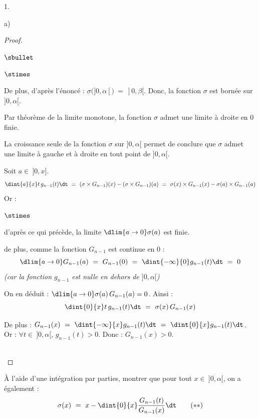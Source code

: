 \begin{noliste}{1.}
\begin{noliste}{a)}
\begin{proof}
\begin{noliste}{$\sbullet$}
\begin{liste}{$\stimes$}
	  \item De plus, d'après l'énoncé : $\sigma(]0,\alpha[) \ = \
	  ]0, \beta[$. Donc, la fonction $\sigma$ est bornée sur 
	  $]0,\alpha[$.
	\end{liste}
	\begin{noliste}{}
	  \item Par théorème de la limite monotone, la fonction 
	  $\sigma$ admet une limite à droite en $0$ finie.
	\end{noliste}
	
	\begin{remark}
	  La croissance seule de la fonction $\sigma$ sur 
	  $]0,\alpha[$ permet de conclure que $\sigma$ 
	  admet une limite à gauche et à droite en tout point de 
	  $]0,\alpha[$.
	\end{remark}
	
	
	\newpage
	
	
	Soit $a \in \ ]0,x]$.
	\[
	  \dint{a}{x} t \, g_{n-1}(t) \dt \ = \ (\sigma \times G_{n-1})
	  (x) - (\sigma \times G_{n-1})(a)
	  \ = \ \sigma(x) \times G_{n-1}(x) - \sigma(a) \times 
	  G_{n-1}(a)
	\]
	Or :
	\begin{noliste}{$\stimes$}
	  \item d'après ce qui précède, la limite $\dlim{a\to 0} 
	  \sigma(a)$ est finie.
	  \item de plus, comme la fonction $G_{n-1}$ est continue 
	  en $0$ : 
	  \[
	    \dlim{a \to 0} G_{n-1}(a) \ = \
	    G_{n-1}(0) \ = \ \dint{-\infty}{0} g_{n-1}(t)
	    \dt \ = \ 0 
	  \]
	  {\it (car la fonction $g_{n-1}$ est nulle en dehors 
	  de $]0,\alpha[$)}
	\end{noliste}
	On en déduit : $\dlim{a\to 0} \sigma(a) \, G_{n-1}(a)=0$. Ainsi 
	:
	\[
	  \dint{0}{x} t \, g_{n-1}(t) \dt \ = \ \sigma(x) \, G_{n-1}(x)
	\]

	
	\item De plus : $G_{n-1}(x) \ = \ \dint{-\infty}{x} g_{n-1}(t)
	\dt \ = \ \dint{0}{x} g_{n-1}(t) \dt$.\\[.1cm]
	Or : $\forall t \in \ ]0, \alpha[$, $g_{n-1}(t) >0$. Donc :
	$G_{n-1}(x) >0$.
      \end{noliste}
      \conc{D'où : $\forall x \in \ ]0,\alpha[$, $\sigma(x) = 
      \dfrac{1}{G_{n-1}(x)} \, \dint{0}{x} t \, g_{n-1}(t) 
      \dt$.}~\\[-1cm]
    \end{proof}
    
    \item À l'aide d'une intégration par parties, montrer que pour tout
    $x \in \ ]0,\alpha[$, on a également : 
    \[
      \sigma(x) \ = \ x - \dint{0}{x} \dfrac{G_{n-1}(t)}{G_{n-1}(x)}
      \dt \qquad (**)
    \]
    

\end{noliste}
\end{noliste}
